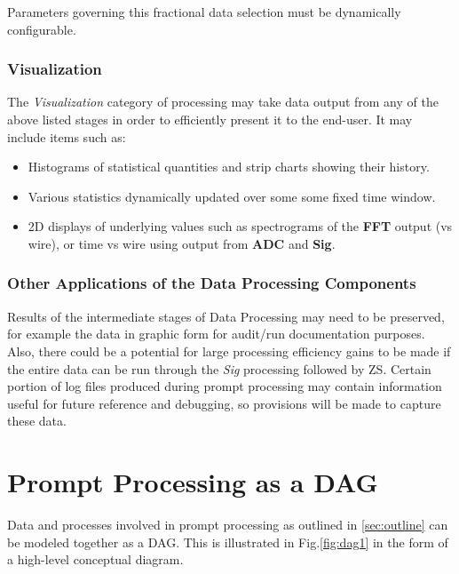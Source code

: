 \documentclass[pdftex,12pt,letter]{article}
\begin{document}
\noindent Parameters governing this fractional data selection must be dynamically configurable.


\subsubsection{Visualization}
\label{sec:viz_intro}

The \textit{Visualization} category of processing
 may take data output from any of the above listed stages in
order to efficiently present it to the end-user. 
It may include items such as:

\begin{itemize}

\item Histograms of statistical quantities and strip charts showing their history.

\item Various statistics dynamically updated over some some fixed time window.

\item 2D displays of underlying values such as spectrograms of the \textbf{FFT}
  output (vs wire), or time vs wire using output from \textbf{ADC} and \textbf{Sig}.

\end{itemize}

\subsubsection{Other Applications of the Data Processing Components}
Results of the intermediate stages of Data Processing may need to be preserved, for
example the data in graphic form for audit/run documentation purposes.
Also, there could be a potential for large processing efficiency
gains to be made if the entire data can be run through the \textit{Sig} processing followed by ZS.
Certain portion of log files produced during prompt processing may contain information useful
for future reference and debugging, so provisions will be made to capture these data.


\section{Prompt Processing as a DAG}
\label{sec:dag}
Data and processes involved in prompt processing as outlined in \ref{sec:outline} can be
modeled together as a DAG. This is illustrated in Fig.\ref{fig:dag1}
in the form of a high-level conceptual diagram.
\end{document}
